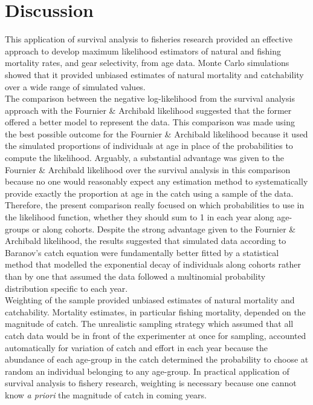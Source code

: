 \documentclass[12pt]{article}
\begin{document}
\section{Discussion}

This application of survival analysis to fisheries research provided an effective approach to develop maximum likelihood estimators of natural and fishing mortality rates, and gear selectivity, from age data. Monte Carlo simulations showed that it provided unbiased estimates of natural mortality and catchability over a wide range of simulated values. \\

The comparison between the negative log-likelihood from the survival analysis approach with the Fournier \& Archibald likelihood \citep{Four82a} suggested that the former offered a better model to represent the data. This comparison was made using the best possible outcome for the Fournier \& Archibald likelihood because it used the simulated proportions of individuals at age in place of the probabilities to compute the likelihood. Arguably, a substantial advantage was given to the Fournier \& Archibald likelihood over the survival analysis in this comparison because no one would reasonably expect any estimation method to systematically provide exactly the proportion at age in the catch using a sample of the data. Therefore, the present comparison really focused on which probabilities to use in the likelihood function, whether they should sum to 1 in each year along age-groups or along cohorts. Despite the strong advantage given to the Fournier \& Archibald likelihood, the results suggested that simulated data according to Baranov's catch equation were fundamentally better fitted by a statistical method that modelled the exponential decay of individuals along cohorts rather than by one that assumed the data followed a multinomial probability distribution specific to each year.\\

Weighting of the sample provided unbiased estimates of natural mortality and catchability. Mortality estimates, in particular fishing mortality, depended on the magnitude of catch. The unrealistic sampling strategy which assumed that all catch data would be in front of the experimenter at once for sampling, accounted automatically for variation of catch and effort in each year because the abundance of each age-group in the catch determined the probability to choose at random an individual belonging to any age-group. In practical application of survival analysis to fishery research, weighting is necessary because one cannot know {\it a priori} the magnitude of catch in coming years. \\
\end{document}
